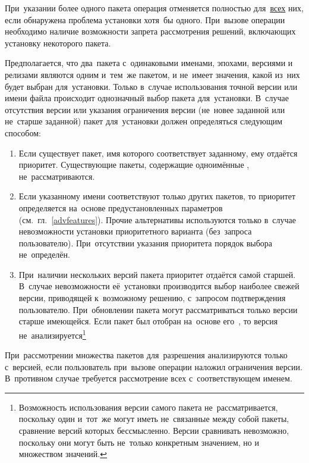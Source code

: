 При~указании более одного пакета операция отменяется полностью для~\underline{всех} них, 
если обнаружена проблема установки хотя~бы одного.
При~вызове операции необходимо наличие возможности запрета рассмотрения решений, 
включающих установку некоторого пакета. 

Предполагается, что два~пакета с~одинаковыми именами, эпохами, версиями и релизами являются одним и~тем~же пакетом,
и не~имеет значения, какой из~них будет выбран для~установки.
Только в~случае использования точной версии или имени файла происходит однозначный выбор пакета для~установки.
В~случае отсутствия версии или указания ограничения версии (не~новее заданной или не~старше заданной)
пакет для~установки должен определяться следующим способом:

\begin{enumerate}

\item{
Если существует пакет, имя которого соответствует заданному, ему отдаётся приоритет.
Существующие пакеты, содержащие одноимённые , не~рассматриваются.
}

\item {
Если указанному имени соответствуют только  других пакетов,
то приоритет определяется на~основе предустановленных параметров (см.~гл.~\ref{advfeatures}).
Прочие альтернативы используются только в~случае невозможности установки приоритетного варианта (без~запроса пользователю).
При~отсутствии указания приоритета порядок выбора не~определён.
}

\item {
При~наличии нескольких версий пакета приоритет отдаётся самой старшей.
В~случае невозможности её~установки производится выбор наиболее свежей версии, приводящей к~возможному решению, с~запросом подтверждения пользователю.
При~обновлении пакета могут рассматриваться только версии старше имеющейся.
Если пакет был отобран на~основе его~, 
то версия не~анализируется\footnote{Возможность использования версии самого пакета не~рассматривается,
поскольку один и~тот~же  могут иметь не~связанные между собой пакеты, сравнение версий которых бессмысленно.
Версии  сравнивать невозможно, поскольку они могут быть не~только конкретным значением, но и множеством значений.}
}

\end{enumerate}

При~рассмотрении множества пакетов для~разрешения 
анализируются  только с~версией, если пользователь при~вызове операции наложил ограничения версии.
В~противном случае требуется рассмотрение всех  с~соответствующем именем.

